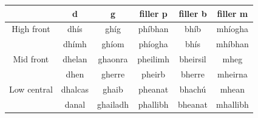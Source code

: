 \documentclass[xelatex,linguex]{TWPL}
\begin{document}
\noindent\hspace*{\fill}
\begin{tabular}{cccccc}
 & d & g & filler p & filler b & filler m\\
\midrule
High front & dhís & ghíg & phíbhan & bhíb & mhíogha\\
 & dhímh & ghíom & phíogha & bhís & mhíbhan\\
\midrule
Mid front & dhelan & ghaonra & pheilimh & bheirsil & mheg\\
 & dhen & gherre & pheirb & bherre & mheirna\\
\midrule
Low central & dhalcas & ghaib & pheanat & bhachú & mhean\\
 & danal & ghailadh & phallibh & bheanat & mhallibh\\
\midrule
\end{tabular}
\hspace*{\fill}
\end{document}
